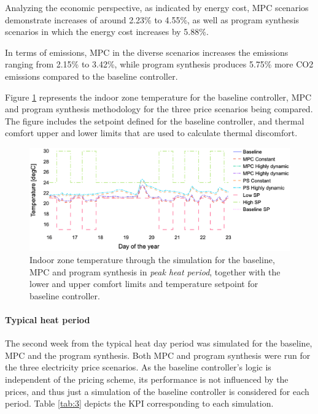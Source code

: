 Analyzing the economic perspective, as indicated by energy cost, MPC scenarios demonstrate increases of around 2.23\% to 4.55\%, as well as program synthesis scenarios in which the energy cost increases by 5.88\%. 

In terms of emissions, MPC in the diverse scenarios increases the emissions ranging from 2.15\% to 3.42\%, while program synthesis produces 5.75\% more CO2 emissions compared to the baseline controller.

Figure \ref{fig:temp-peak} represents the indoor zone temperature for the baseline controller, MPC and program synthesis methodology for the three price scenarios being compared. The figure includes the setpoint defined for the baseline controller, and thermal comfort upper and lower limits that are used to calculate thermal discomfort.

\begin{figure}
  \includegraphics[width=\linewidth]{images/boptest/Fig4.eps}
\caption{Indoor zone temperature through the simulation for the baseline, MPC and program synthesis in \emph{peak heat period}, together with the lower and upper comfort limits and temperature setpoint for baseline controller.}
\label{fig:temp-peak}       %
\end{figure}

\paragraph{Typical heat period}
The second week from the typical heat day period was simulated for the baseline, MPC and the program synthesis. Both MPC and program synthesis were run for the three electricity price scenarios. As the baseline controller's logic is independent of the pricing scheme, its performance is not influenced by the prices, and thus just a simulation of the baseline controller is considered for each period. Table \ref{tab:3} depicts the KPI corresponding to each simulation.

